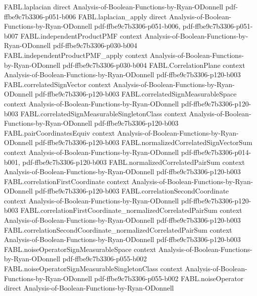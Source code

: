 \begin{theorem}
\proofstep
  {FABL.laplacian}
  {direct}
  {Analysis-of-Boolean-Functions-by-Ryan-ODonnell}
  {pdf-ffbe9c7b3306-p051-b006}
\proofstep
  {FABL.laplacian_apply}
  {direct}
  {Analysis-of-Boolean-Functions-by-Ryan-ODonnell}
  {pdf-ffbe9c7b3306-p051-b006,
    pdf-ffbe9c7b3306-p051-b007}
\proofstep
  {FABL.independentProductPMF}
  {context}
  {Analysis-of-Boolean-Functions-by-Ryan-ODonnell}
  {pdf-ffbe9c7b3306-p030-b004}
\proofstep
  {FABL.independentProductPMF_apply}
  {context}
  {Analysis-of-Boolean-Functions-by-Ryan-ODonnell}
  {pdf-ffbe9c7b3306-p030-b004}
\proofstep
  {FABL.CorrelationPlane}
  {context}
  {Analysis-of-Boolean-Functions-by-Ryan-ODonnell}
  {pdf-ffbe9c7b3306-p120-b003}
\proofstep
  {FABL.correlatedSignVector}
  {context}
  {Analysis-of-Boolean-Functions-by-Ryan-ODonnell}
  {pdf-ffbe9c7b3306-p120-b003}
\proofstep
  {FABL.correlatedSignMeasurableSpace}
  {context}
  {Analysis-of-Boolean-Functions-by-Ryan-ODonnell}
  {pdf-ffbe9c7b3306-p120-b003}
\proofstep
  {FABL.correlatedSignMeasurableSingletonClass}
  {context}
  {Analysis-of-Boolean-Functions-by-Ryan-ODonnell}
  {pdf-ffbe9c7b3306-p120-b003}
\proofstep
  {FABL.pairCoordinatesEquiv}
  {context}
  {Analysis-of-Boolean-Functions-by-Ryan-ODonnell}
  {pdf-ffbe9c7b3306-p120-b003}
\proofstep
  {FABL.normalizedCorrelatedSignVectorSum}
  {context}
  {Analysis-of-Boolean-Functions-by-Ryan-ODonnell}
  {pdf-ffbe9c7b3306-p014-b001,
    pdf-ffbe9c7b3306-p120-b003}
\proofstep
  {FABL.normalizedCorrelatedPairSum}
  {context}
  {Analysis-of-Boolean-Functions-by-Ryan-ODonnell}
  {pdf-ffbe9c7b3306-p120-b003}
\proofstep
  {FABL.correlationFirstCoordinate}
  {context}
  {Analysis-of-Boolean-Functions-by-Ryan-ODonnell}
  {pdf-ffbe9c7b3306-p120-b003}
\proofstep
  {FABL.correlationSecondCoordinate}
  {context}
  {Analysis-of-Boolean-Functions-by-Ryan-ODonnell}
  {pdf-ffbe9c7b3306-p120-b003}
\proofstep
  {FABL.correlationFirstCoordinate_normalizedCorrelatedPairSum}
  {context}
  {Analysis-of-Boolean-Functions-by-Ryan-ODonnell}
  {pdf-ffbe9c7b3306-p120-b003}
\proofstep
  {FABL.correlationSecondCoordinate_normalizedCorrelatedPairSum}
  {context}
  {Analysis-of-Boolean-Functions-by-Ryan-ODonnell}
  {pdf-ffbe9c7b3306-p120-b003}
\proofstep
  {FABL.noiseOperatorSignMeasurableSpace}
  {context}
  {Analysis-of-Boolean-Functions-by-Ryan-ODonnell}
  {pdf-ffbe9c7b3306-p055-b002}
\proofstep
  {FABL.noiseOperatorSignMeasurableSingletonClass}
  {context}
  {Analysis-of-Boolean-Functions-by-Ryan-ODonnell}
  {pdf-ffbe9c7b3306-p055-b002}
\proofstep
  {FABL.noiseOperator}
  {direct}
  {Analysis-of-Boolean-Functions-by-Ryan-ODonnell}

\end{theorem}

